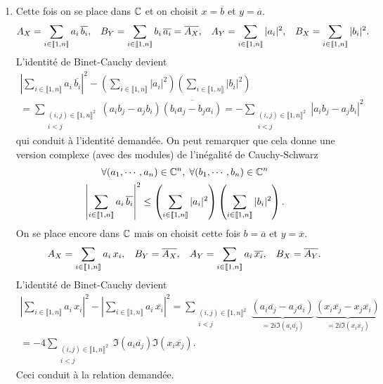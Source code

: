 \begin{enumerate}
 \item Cette fois on se place dans $\mathbb{C}$ et on choisit $x= \overline{b}$ et $y=\overline{a}$.
\[
 A_X = \sum_{i\in \llbracket 1,n \rrbracket}a_i\,\overline{b_i},\hspace{0.3cm}
 B_Y = \sum_{i\in \llbracket 1,n \rrbracket}b_i\,\overline{a_i} = \overline{A_X},\hspace{0.3cm}
 A_Y = \sum_{i\in \llbracket 1,n \rrbracket}|a_i|^2 ,\hspace{0.3cm}
 B_X = \sum_{i\in \llbracket 1,n \rrbracket}|b_i|^2.
\]
L'identité de Binet-Cauchy devient
\begin{multline*}
 \left|\sum_{i\in \llbracket 1,n \rrbracket}a_i\,\overline{b_i}\right|^2 
- \left( \sum_{i\in \llbracket 1,n \rrbracket}|a_i|^2 \right) \left(\sum_{i\in \llbracket 1,n \rrbracket}|b_i|^2 \right)\\
  = \sum_{\substack{(i,j)\in \llbracket 1,n\rrbracket^2 \\ i < j}} (a_ib_j - a_jb_i) \overline{(b_i a_j - b_j a_i)}
  = - \sum_{\substack{(i,j)\in \llbracket 1,n\rrbracket^2 \\ i < j}} |a_ib_j - a_jb_i|^2
\end{multline*}
qui conduit à l'identité demandée. On peut remarquer que cela donne une version complexe (avec des modules) de l'inégalité de Cauchy-Schwarz
\begin{multline*}
 \forall (a_1,\cdots, a_n)\in \mathbb{C}^n,\; \forall (b_1,\cdots, b_n)\in \mathbb{C}^n \\
 \left|\sum_{i\in \llbracket 1,n \rrbracket}a_i\,\overline{b_i}\right|^2 
\leq \left( \sum_{i\in \llbracket 1,n \rrbracket}|a_i|^2 \right) \left(\sum_{i\in \llbracket 1,n \rrbracket}|b_i|^2 \right). 
\end{multline*}
On se place encore dans $\mathbb{C}$ mais on choisit cette fois $b = \overline{a}$ et $y=\overline{x}$.
\[
 A_X = \sum_{i\in \llbracket 1,n \rrbracket}a_i\,x_i,\hspace{0.3cm}
 B_Y = \overline{A_X},\hspace{0.3cm}
 A_Y = \sum_{i\in \llbracket 1,n \rrbracket}a_i\,\overline{x_i},\hspace{0.3cm}
 B_X = \overline{A_Y}.
\]
L'identité de Binet-Cauchy devient
\begin{multline*}
 \left|\sum_{i\in \llbracket 1,n \rrbracket}a_i\,x_i\right|^2 
 - \left|\sum_{i\in \llbracket 1,n \rrbracket}a_i\, \overline{x_i}\right|^2 
 = \sum_{\substack{(i,j)\in \llbracket 1,n\rrbracket^2 \\ i < j}} 
 \underset{ = 2i \Im(a_i\overline{a_j})}{\underbrace{(a_i\overline{a_j} - a_j\overline{a_i})}} \,
 \underset{ = 2i \Im(x_i \overline{x_j})}{\underbrace{(x_i \overline{x_j} - x_j \overline{x_i})}}
 \\
 = - 4 \sum_{\substack{(i,j)\in \llbracket 1,n\rrbracket^2 \\ i < j}} \Im(a_i\overline{a_j})\Im(x_i \overline{x_j}).
\end{multline*}
Ceci conduit à la relation demandée. 

\end{enumerate}
